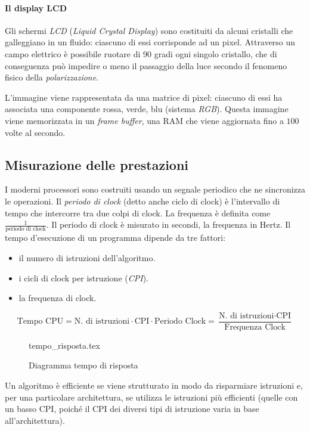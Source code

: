 \documentclass[class=book, crop=false, oneside]{standalone}
\begin{document}
\paragraph{Il display LCD}
Gli schermi \emph{LCD} (\emph{Liquid Crystal Display}) sono costituiti da alcuni cristalli che galleggiano in un fluido: ciascuno di essi corrisponde ad un pixel.
Attraverso un campo elettrico è possibile ruotare di 90 gradi ogni singolo cristallo, che di conseguenza può impedire o meno il passaggio della luce secondo il fenomeno fisico della \emph{polarizzazione}.

L'immagine viene rappresentata da una matrice di pixel: ciascuno di essi ha associata una componente rossa, verde, blu (sistema \emph{RGB}).
Questa immagine viene memorizzata in un \emph{frame buffer}, una RAM che viene aggiornata fino a \(100\) volte al secondo.

\subsection{Misurazione delle prestazioni}
I moderni processori sono costruiti usando un segnale periodico che ne sincronizza le operazioni. Il \emph{periodo di clock} (detto anche ciclo di clock) è l'intervallo di tempo che intercorre tra due colpi di clock. La frequenza è definita come \(\frac{1}{\text{periodo di clock}}\). Il periodo di clock è misurato in secondi, la frequenza in Hertz. Il tempo d'esecuzione di un programma dipende da tre fattori:
\begin{itemize}[nolistsep]
	\item il numero di istruzioni dell'algoritmo.
	\item i cicli di clock per istruzione (\emph{CPI}).
	\item la frequenza di clock.
\end{itemize}

\begin{equation*}
\text{Tempo CPU} = \text{N. di istruzioni} \cdot \text{CPI} \cdot \text{Periodo Clock} = \frac{\text{N. di istruzioni} \cdot \text{CPI}}{\text{Frequenza Clock}}
\end{equation*}

\begin{figure}[H]
	\centering
	{tempo_risposta.tex}
	\caption{Diagramma tempo di risposta}
\end{figure}

Un algoritmo è efficiente se viene strutturato in modo da risparmiare istruzioni e, per una particolare architettura, se utilizza le istruzioni più efficienti (quelle con un basso CPI, poiché il CPI dei diversi tipi di istruzione varia in base all'architettura).
\end{document}
